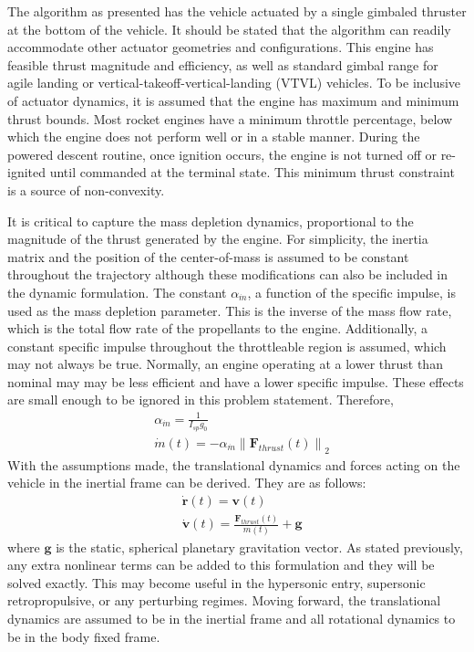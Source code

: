 \documentclass[conf]{new-aiaa}
\begin{document}
The algorithm as presented has the vehicle actuated by a single gimbaled thruster at the bottom of the vehicle. It should be stated that the algorithm can readily accommodate other actuator geometries and configurations. This engine has feasible thrust magnitude and efficiency, as well as standard gimbal range for agile landing or vertical-takeoff-vertical-landing (VTVL) vehicles. To be inclusive of actuator dynamics, it is assumed that the engine has maximum and minimum thrust bounds. Most rocket engines have a minimum throttle percentage, below which the engine does not perform well or in a stable manner. During the powered descent routine, once ignition occurs, the engine is not turned off or re-ignited until commanded at the terminal state. This minimum thrust constraint is a source of non-convexity.

It is critical to capture the mass depletion dynamics, proportional to the magnitude of the thrust generated by the engine. For simplicity, the inertia matrix and the position of the center-of-mass is assumed to be constant throughout the trajectory although these modifications can also be included in the dynamic formulation. The constant $\alpha_{\dot{m}}$, a function of the specific impulse, is used as the mass depletion parameter. This is the inverse of the mass flow rate, which is the total flow rate of the propellants to the engine. Additionally, a constant specific impulse throughout the throttleable region is assumed, which may not always be true. Normally, an engine operating at a lower thrust than nominal may may be less efficient and have a lower specific impulse. These effects are small enough to be ignored in this problem statement. Therefore,
% 
\begin{align}
& \alpha_{\dot{m}} = \frac{1}{I_{sp} g_0} \\
& \dot{m}(t) = -\alpha_{\dot{m}} \left\lVert \mathbf{F}_{thrust}(t) \right\rVert _2
\end{align}
% 
With the assumptions made, the translational dynamics and forces acting on the vehicle in the inertial frame can be derived. They are as follows:
% 
\begin{align}
& \dot{\mathbf{r}}(t) = \mathbf{v}(t) \\
& \dot{\mathbf{v}}(t) = \frac{\mathbf{F}_{thrust}(t)}{m(t)} + \mathbf{g}
\end{align}
where $\mathbf{g}$ is the static, spherical planetary gravitation vector. As stated previously, any extra nonlinear terms can be added to this formulation and they will be solved exactly. This may become useful in the hypersonic entry, supersonic retropropulsive, or any perturbing regimes. Moving forward, the translational dynamics are assumed to be in the inertial frame and all rotational dynamics to be in the body fixed frame.
\end{document}
